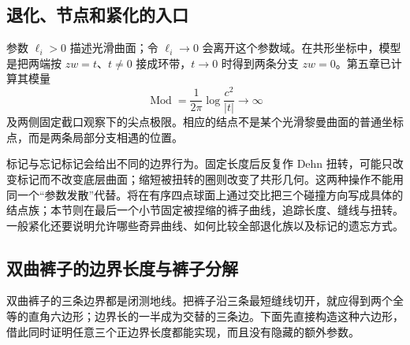\subsection{退化、节点和紧化的入口}
\label{g4:subsec:0604:04}

参数 \(\ell_i>0\) 描述光滑曲面；令 \(\ell_i\to0\) 会离开这个参数域。在共形坐标中，模型是把两端按 \(zw=t\)、\(t\ne0\) 接成环带，\(t\to0\) 时得到两条分支 \(zw=0\)。第五章已计算其模量
\[
	\operatorname{Mod}=\frac1{2\pi}\log\frac{c^2}{|t|}\longrightarrow\infty
\]
及两侧固定截口观察下的尖点极限。相应的结点不是某个光滑黎曼曲面的普通坐标点，而是两条局部分支相遇的位置。

\ProseParagraphBreak

标记与忘记标记会给出不同的边界行为。固定长度后反复作 Dehn 扭转，可能只改变标记而不改变底层曲面；缩短被扭转的圈则改变了共形几何。这两种操作不能用同一个“参数发散”代替。将在有序四点球面上通过交比把三个碰撞方向写成具体的结点族；本节则在最后一个小节固定被捏缩的裤子曲线，追踪长度、缝线与扭转。一般紧化还要说明允许哪些奇异曲线、如何比较全部退化族以及标记的遗忘方式。

\subsection{双曲裤子的边界长度与裤子分解}
\label{g4:subsec:0604:05}

双曲裤子的三条边界都是闭测地线。把裤子沿三条最短缝线切开，就应得到两个全等的直角六边形；边界长的一半成为交替的三条边。下面先直接构造这种六边形，借此同时证明任意三个正边界长度都能实现，而且没有隐藏的额外参数。

